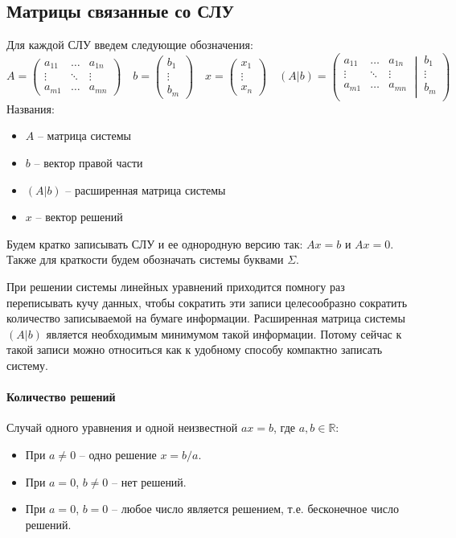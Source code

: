 \subsection{Матрицы связанные со СЛУ}

Для каждой СЛУ введем следующие обозначения:
\[
A= 
\begin{pmatrix}
a_{11}&\ldots& a_{1n}\\
\vdots&\ddots&\vdots\\
a_{m1}& \ldots &a_{mn}
\end{pmatrix}\quad
b = 
\begin{pmatrix}
b_1\\
\vdots\\
b_m
\end{pmatrix} \quad
x =
\begin{pmatrix}
x_1\\
\vdots\\
x_n
\end{pmatrix}\quad
(A|b) =
\left(\left.
\begin{matrix}
a_{11}&\ldots&a_{1n}\\
\vdots&\ddots&\vdots\\
a_{m1}&\ldots&a_{mn}\\
\end{matrix}
\:\right|\:
\begin{matrix}
b_1\\
\vdots\\
b_m\\
\end{matrix}\right)
\]
Названия:
\begin{itemize}
\item $A$ -- матрица системы
\item $b$ -- вектор правой части
\item $(A|b)$ -- расширенная матрица системы
\item $x$ -- вектор решений
\end{itemize}
Будем кратко записывать СЛУ и ее однородную версию так: $Ax = b$ и $Ax = 0$.
Также для краткости будем обозначать системы буквами $\Sigma$. 

При решении системы линейных уравнений приходится помногу раз переписывать кучу данных, чтобы сократить эти записи целесообразно сократить количество записываемой на бумаге информации.
Расширенная матрица системы $(A|b)$ является необходимым минимумом такой информации.
Потому сейчас к такой записи можно относиться как к удобному способу компактно записать систему.

\paragraph{Количество решений}
Случай одного уравнения и одной неизвестной $ax = b$, где $a, b\in \mathbb R$:
\begin{itemize}
\item При $a\neq 0$ -- одно решение $x = b/a$.
\item При $a = 0$, $b\neq 0$ -- нет решений.

\item При $a = 0$, $b = 0$ -- любое число является решением, т.е. бесконечное число решений.
\end{itemize}

